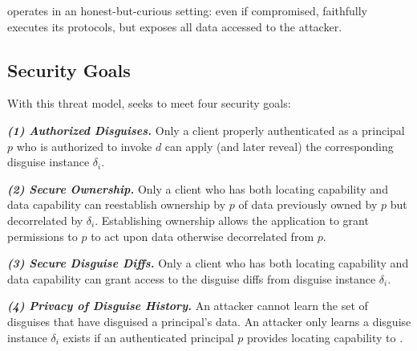 %
\sys operates in an honest-but-curious setting: even if compromised, \sys faithfully executes
its protocols, but exposes all data accessed to the attacker.
%

\subsection{Security Goals}
%
With this threat model, \sys seeks to meet four security goals:
%

%
\vspace{6pt}\noindent\textbf{\emph{(1) Authorized Disguises.}}
%
Only a client properly authenticated as a principal $p$ who is authorized to invoke $d$ can apply (and
later reveal) the corresponding disguise instance $\delta_i$.
%

%
\vspace{6pt}\noindent\textbf{\emph{(2) Secure Ownership.}}
%
Only a client who has both locating capability  and data capability
 can reestablish ownership by $p$ of data previously owned by $p$ but decorrelated by $\delta_i$.
Establishing ownership allows the application to grant permissions to $p$ to act upon data otherwise
decorrelated from $p$.
%

\vspace{6pt}\noindent\textbf{\emph{(3) Secure Disguise Diffs.}}
%
Only a client who has both locating capability  and data capability
 can grant \sys access to the disguise diffs from disguise instance $\delta_i$.
%

\vspace{6pt}\noindent\textbf{\emph{(4) Privacy of Disguise History.}}
%
An attacker cannot learn the set of disguises that have disguised a principal's data.
%
An attacker only learns a disguise instance $\delta_i$ exists if an authenticated principal $p$ provides
locating capability  to \sys.

